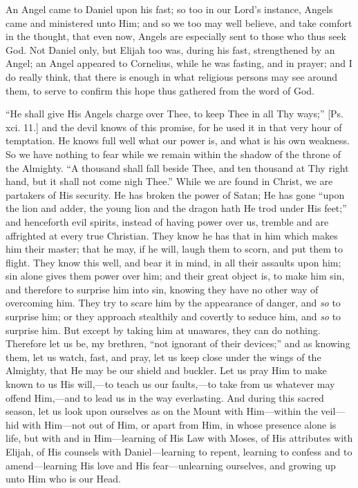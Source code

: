 An Angel came to Daniel upon his fast; so too in our Lord's
instance, Angels came and ministered unto Him; and so we too may well
believe, and take comfort in the thought, that even now, Angels are
especially sent to those who thus seek God. Not Daniel only, but
Elijah too was, during his fast, strengthened by an Angel; an Angel
appeared to Cornelius, while he was fasting, and in prayer; and I do
really think, that there is enough in what religious persons may see
around them, to serve to confirm this hope thus gathered from the word
of God.

``He shall give His Angels charge over Thee, to keep Thee in
all Thy ways;'' [Ps. xci. 11.] and the devil knows of this
promise, for he used it in that very hour of temptation. He knows full
well what our power is, and what is his own weakness. So we have
nothing to fear while we remain within the shadow of the throne of the
Almighty. ``A thousand shall fall beside Thee, and ten thousand at
Thy right hand, but it shall not come nigh Thee.'' While we are
found in Christ, we are partakers of His security. He has broken the
power of Satan; He has gone ``upon the lion and adder, the young
lion and the dragon hath He trod under His feet;'' and henceforth
evil spirits, instead of having power over us, tremble and are
affrighted at every true Christian. They know he has that in him which
makes him their master; that he may, if he will, laugh them to scorn,
and put them to flight. They know this well, and bear it in mind, in
all their assaults upon him; sin alone gives them power over him; and
their great object is, to make him sin, and therefore to surprise him
into sin, knowing they have no other way of overcoming him. They try
to scare him by the appearance of danger, and \emph{so} to surprise
him; or they approach stealthily and covertly to seduce him, and \emph{so}
to surprise him. But except by taking him at unawares, they can do
nothing. Therefore let us be, my brethren, ``not ignorant of their
devices;'' and as knowing them, let us watch, fast, and pray, let
us keep close under the wings of the Almighty, that He may be our
shield and buckler. Let us pray Him to make known to us His will,—to
teach us our faults,—to take from us whatever may offend Him,—and
to lead us in the way everlasting. And during this sacred season, let
us look upon ourselves as on the Mount with Him—within the veil—hid
with Him—not out of Him, or apart from Him, in whose presence alone
is life, but with and in Him—learning of His Law with Moses, of His
attributes with Elijah, of His counsels with Daniel—learning to
repent, learning to confess and to amend—learning His love and His
fear—unlearning ourselves, and growing up unto Him who is our Head.


